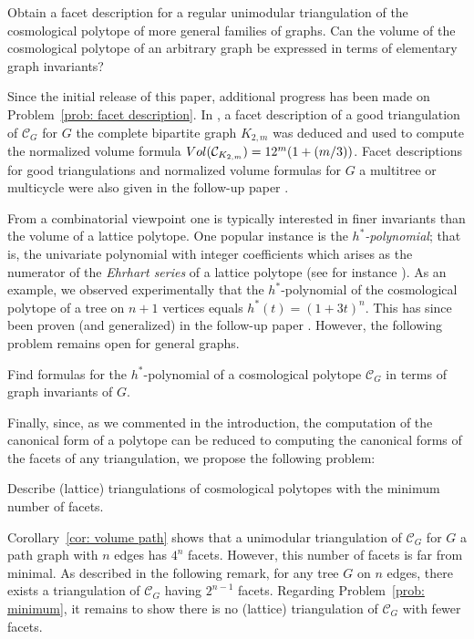 \documentclass[11pt]{article}
\theoremstyle{definition}
\numberwithin{equation}{section}
\begin{document}
\begin{problem}
    \label{prob: facet description}
    Obtain a facet description for a regular unimodular triangulation of the cosmological polytope of more general families of graphs. Can the volume of the cosmological polytope of an arbitrary graph be expressed in terms of elementary graph invariants?
\end{problem}

Since the initial release of this paper, additional progress has been made on Problem~\ref{prob: facet description}.  
In \cite{landin2023cosmological}, a facet description of a good triangulation of $\mathcal{C}_G$ for $G$ the complete bipartite graph $K_{2,m}$ was deduced and used to compute the normalized volume formula $\textnormal{Vol}(\mathcal{C}_{K_{2,m}})=12^m(1 + (m/3))$. 
Facet descriptions for good triangulations and normalized volume formulas for $G$ a multitree or multicycle were also given in the follow-up paper \cite{bruckamp2024ehrhart}. 

From a combinatorial viewpoint one is typically interested in finer invariants than the volume of a lattice polytope. 
One popular instance is the \emph{$h^*$-polynomial}; that is, the  univariate polynomial with integer coefficients which arises as the numerator of the \emph{Ehrhart series} of a lattice polytope (see for instance \cite[Chapter 3]{ccd}). 
As an example, we observed experimentally that the $h^*$-polynomial of the cosmological polytope of a tree on $n+1$ vertices equals $h^*(t)=(1+3t)^n$.
This has since been proven (and generalized) in the follow-up paper \cite{bruckamp2024ehrhart}.
However, the following problem remains open for general graphs.

\begin{problem}
	Find formulas for the $h^*$-polynomial of a cosmological polytope $\mathcal{C}_G$ in terms of graph invariants of $G$.
\end{problem}

Finally, since, as we commented in the introduction, the computation of the canonical form of a polytope can be reduced to computing the canonical forms of the facets of any triangulation, we propose the following problem:

\begin{problem}
    \label{prob: minimum}
	Describe (lattice) triangulations of cosmological polytopes with the minimum number of facets.
\end{problem}

Corollary~\ref{cor: volume path} shows that a unimodular triangulation of $\mathcal{C}_{G}$ for $G$ a path graph with $n$ edges has $4^n$ facets.  
However, this number of facets is far from minimal.  
As described in the following remark, for any tree $G$ on $n$ edges, there exists a triangulation of $\mathcal{C}_G$ having $2^{n-1}$ facets. 
Regarding Problem~\ref{prob: minimum}, it remains to show there is no (lattice) triangulation of $\mathcal{C}_G$ with fewer facets. 
\end{document}
